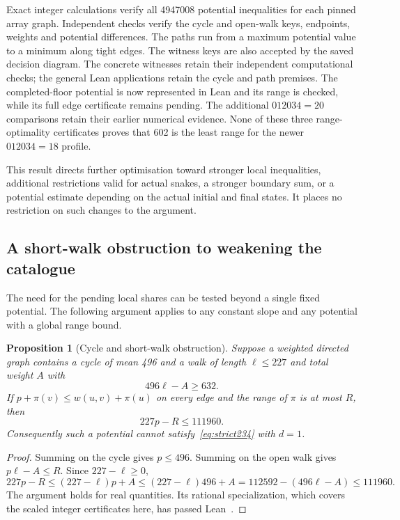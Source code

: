 \documentclass[11pt,a4paper]{article}
\newtheorem{proposition}[theorem]{Proposition}
\theoremstyle{definition}
\theoremstyle{remark}
\begin{document}
Exact integer calculations verify all 4947008 potential inequalities for
each pinned array graph. Independent checks verify the cycle and open-walk
keys, endpoints, weights and potential differences. The paths run from a
maximum potential value to a minimum along tight edges. The witness keys
are also accepted by the saved decision diagram. The concrete witnesses retain their independent computational checks;
the general Lean applications retain the cycle and path premises. The
completed-floor potential is now represented in Lean and its range is
checked, while its full edge certificate remains pending. The additional
$012034=20$ comparisons retain their earlier numerical evidence. None of
these three range-optimality certificates proves that 602 is the least
range for the newer $012034=18$ profile.

This result directs further optimisation toward stronger local inequalities,
additional restrictions valid for actual snakes, a stronger boundary sum,
or a potential estimate depending on the actual initial and final states.
It places no restriction on such changes to the argument.

\subsection{A short-walk obstruction to weakening the catalogue}\label{sec:short-walk}
The need for the pending local shares can be tested beyond a single fixed potential. The following argument applies to any constant slope and any potential with a global range bound.

\begin{proposition}[Cycle and short-walk obstruction]\label{prop:short-walk-obstruction}
Suppose a weighted directed graph contains a cycle of mean 496 and a walk of length $\ell\le227$ and total weight $A$ with
\[
496\ell-A\ge632.
\]
If $p+\pi(v)\le w(u,v)+\pi(u)$ on every edge and the range of $\pi$ is at most $R$, then
\[
227p-R\le111960.
\]
Consequently such a potential cannot satisfy~\eqref{eq:strict234} with $d=1$.
\end{proposition}
\begin{proof}
Summing on the cycle gives $p\le496$. Summing on the open walk gives $p\ell-A\le R$. Since $227-\ell\ge0$,
\[
227p-R\le(227-\ell)p+A
\le(227-\ell)496+A
=112592-(496\ell-A)\le111960.
\]
The argument holds for real quantities. Its rational specialization, which covers the scaled integer certificates here, has passed Lean~\cite{obstructionarchive}.
\end{proof}
\end{document}
